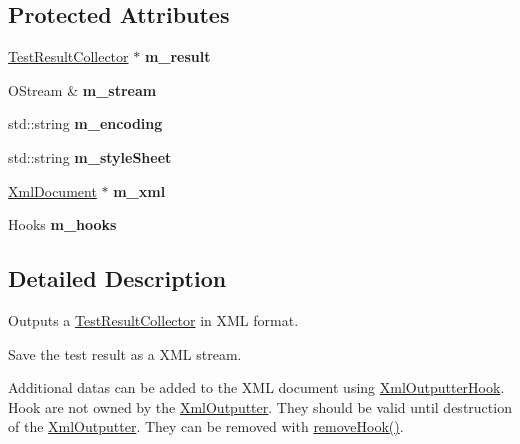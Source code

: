 \subsection*{Protected Attributes}
\begin{DoxyCompactItemize}
\item 
\hypertarget{class_xml_outputter_a4976372e653e74bb90b2c639f3b69e7a}{\hyperlink{class_test_result_collector}{Test\+Result\+Collector} $\ast$ {\bfseries m\+\_\+result}}\label{class_xml_outputter_a4976372e653e74bb90b2c639f3b69e7a}

\item 
\hypertarget{class_xml_outputter_a38a0f2e298c86437d282c0436dbb3c48}{O\+Stream \& {\bfseries m\+\_\+stream}}\label{class_xml_outputter_a38a0f2e298c86437d282c0436dbb3c48}

\item 
\hypertarget{class_xml_outputter_a193e314a66971eec760045fc20e5a2d1}{std\+::string {\bfseries m\+\_\+encoding}}\label{class_xml_outputter_a193e314a66971eec760045fc20e5a2d1}

\item 
\hypertarget{class_xml_outputter_a83e00800a42c2a62127e335f28b58230}{std\+::string {\bfseries m\+\_\+style\+Sheet}}\label{class_xml_outputter_a83e00800a42c2a62127e335f28b58230}

\item 
\hypertarget{class_xml_outputter_ac75c5dec9b4ee6135633d583c2109e6a}{\hyperlink{class_xml_document}{Xml\+Document} $\ast$ {\bfseries m\+\_\+xml}}\label{class_xml_outputter_ac75c5dec9b4ee6135633d583c2109e6a}

\item 
\hypertarget{class_xml_outputter_a54643e72aed488db22338cb878be2c81}{Hooks {\bfseries m\+\_\+hooks}}\label{class_xml_outputter_a54643e72aed488db22338cb878be2c81}

\end{DoxyCompactItemize}


\subsection{Detailed Description}
Outputs a \hyperlink{class_test_result_collector}{Test\+Result\+Collector} in X\+M\+L format.

Save the test result as a X\+M\+L stream. 

Additional datas can be added to the X\+M\+L document using \hyperlink{class_xml_outputter_hook}{Xml\+Outputter\+Hook}. Hook are not owned by the \hyperlink{class_xml_outputter}{Xml\+Outputter}. They should be valid until destruction of the \hyperlink{class_xml_outputter}{Xml\+Outputter}. They can be removed with \hyperlink{class_xml_outputter_a2fa419bef59d5f38c32fb5af9d26c7af}{remove\+Hook()}.

